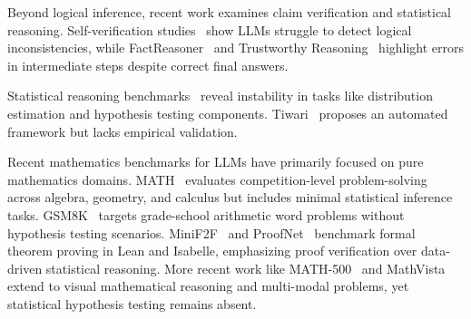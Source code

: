 \documentclass{article}
\begin{document}
Beyond logical inference, recent work examines claim verification and statistical reasoning. Self-verification studies~\cite{hong2024closer} show LLMs struggle to detect logical inconsistencies, while FactReasoner~\cite{marinescu2025factreasoner} and Trustworthy Reasoning~\cite{jiao2025trustworthy} highlight errors in intermediate steps despite correct final answers.

Statistical reasoning benchmarks~\cite{liu2024llms,zhu2024are} reveal instability in tasks like distribution estimation and hypothesis testing components. Tiwari~\cite{tiwari2025framework} proposes an automated framework but lacks empirical validation.

Recent mathematics benchmarks for LLMs have primarily focused on pure mathematics domains. MATH~\cite{hendrycks2021measuring} evaluates competition-level problem-solving across algebra, geometry, and calculus but includes minimal statistical inference tasks. GSM8K~\cite{cobbe2021training} targets grade-school arithmetic word problems without hypothesis testing scenarios. MiniF2F~\cite{zheng2021minif2f} and ProofNet~\cite{azerbayev2023proofnet} benchmark formal theorem proving in Lean and Isabelle, emphasizing proof verification over data-driven statistical reasoning. More recent work like MATH-500~\cite{lightman2023let} and MathVista~\cite{lu2023mathvista} extend to visual mathematical reasoning and multi-modal problems, yet statistical hypothesis testing remains absent.
\end{document}
